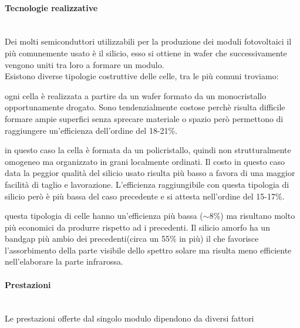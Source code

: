 \paragraph{Tecnologie realizzative}\mbox{}\\
Dei molti semiconduttori utilizzabili per la produzione dei moduli fotovoltaici il più comunemente usato è il silicio, esso si ottiene in wafer che successivamente vengono uniti tra loro a formare un modulo.\\
Esistono diverse tipologie costruttive delle celle, tra le più comuni troviamo:
\begin{description}[labelindent=5mm]
    \item[$\cdot$ Silicio monocristallino:] ogni cella è realizzata a partire da un wafer formato da un monocristallo opportunamente drogato. Sono tendenzialmente costose perchè risulta difficile formare ampie superfici senza sprecare materiale o spazio però permettono di raggiungere un'efficienza dell'ordine del 18-21\%.
    \item[$\cdot$ Silicio policristallino:] in questo caso la cella è formata da un policristallo, quindi non strutturalmente omogeneo ma organizzato in grani localmente ordinati. Il costo in questo caso data la peggior qualità del silicio usato risulta più basso a favora di una maggior facilità di taglio e lavorazione. L'efficienza raggiungibile con questa tipologia di silicio però è più bassa del caso precedente e si attesta nell'ordine del 15-17\%. 
    \item[$\cdot$ Silicio amorfo:] questa tipologia di celle hanno un'efficienza più bassa ($\sim8\%$) ma risultano molto più economici da produrre rispetto ad i precedenti. Il silicio amorfo ha un bandgap più ambio dei precedenti(circa un 55\% in più) il che favorisce l'assorbimento della parte visibile dello spettro solare ma risulta meno efficiente nell'elaborare la parte infrarossa.
\end{description}
\paragraph{Prestazioni}\mbox{}\\
Le prestazioni offerte dal singolo modulo dipendono da diversi fattori